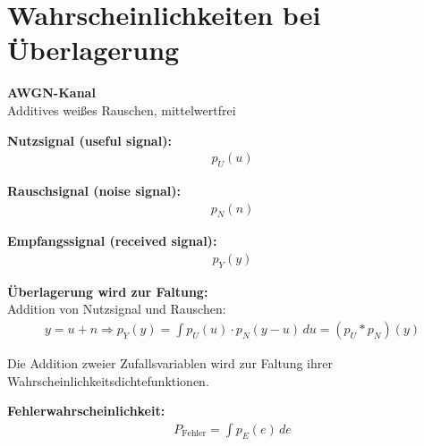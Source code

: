 \section{Wahrscheinlichkeiten bei Überlagerung}

\textbf{AWGN-Kanal}\\
Additives weißes Rauschen, mittelwertfrei


\textbf{Nutzsignal (useful signal):}
\begin{align}
p_U(u)
\end{align}

\textbf{Rauschsignal (noise signal):}
\begin{align}
p_N(n)
\end{align}

\textbf{Empfangssignal (received signal):}
\begin{align}
p_Y(y)
\end{align}

\textbf{Überlagerung wird zur Faltung:}\\
Addition von Nutzsignal und Rauschen:
\begin{align}
y = u + n \Rightarrow p_Y(y) = \int p_U(u) \cdot p_N(y-u) \, du = (p_U * p_N)(y)
\end{align}

Die Addition zweier Zufallsvariablen wird zur Faltung ihrer Wahrscheinlichkeitsdichtefunktionen.

\textbf{Fehlerwahrscheinlichkeit:}
\begin{align}
P_{\text{Fehler}} = \int p_E(e)\,de
\end{align}
